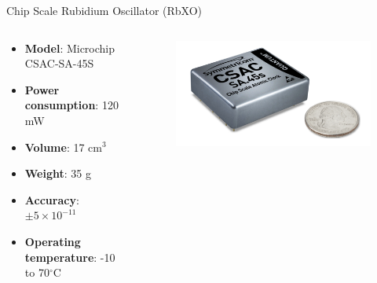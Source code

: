 \begin{frame}{Chip Scale Rubidium Oscillator (RbXO)}

    \begin{columns}[t]
        \begin{column}[t]{0.65\textwidth}
            \begin{itemize}
                \item \textbf{Model}: Microchip CSAC-SA-45S
                \vspace{0.2cm}
                \item \textbf{Power consumption}: 120 mW
                \vspace{0.2cm}
                \item \textbf{Volume}: 17 cm$^{3}$
                \vspace{0.2cm}
                \item \textbf{Weight}: 35 g
                \vspace{0.2cm}
                \item \textbf{Accuracy}: $\pm 5 \times 10^{-11}$
                \vspace{0.2cm}
                \item \textbf{Operating temperature}: -10 to 70$^{\circ}$C
            \end{itemize}
        \end{column}
        \begin{column}[t]{0.5\textwidth}
            \begin{figure}[!ht]
                \begin{center}
                    \includegraphics[width=\columnwidth]{figures/microchip-csac}
                \end{center}
            \end{figure}
        \end{column}
    \end{columns}

\end{frame}


